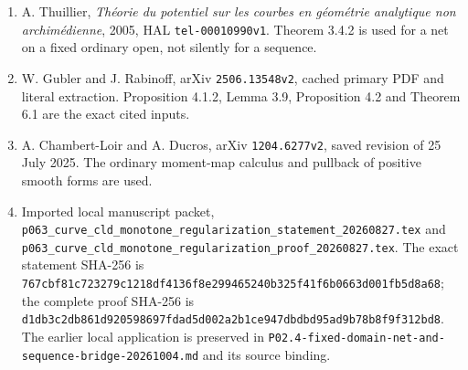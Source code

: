 \documentclass[
  11pt,
]{article}
\providecommand{\tightlist}{%
  \setlength{\itemsep}{0pt}\setlength{\parskip}{0pt}}
\begin{document}
\begin{enumerate}
\def\labelenumi{\arabic{enumi}.}
\tightlist
\item
  A. Thuillier, \emph{Théorie du potentiel sur les courbes en géométrie
  analytique non archimédienne}, 2005, HAL \texttt{tel-00010990v1}.
  Theorem 3.4.2 is used for a net on a fixed ordinary open, not silently
  for a sequence.
\item
  W. Gubler and J. Rabinoff, arXiv \texttt{2506.13548v2}, cached primary
  PDF and literal extraction. Proposition 4.1.2, Lemma 3.9, Proposition
  4.2 and Theorem 6.1 are the exact cited inputs.
\item
  A. Chambert-Loir and A. Ducros, arXiv \texttt{1204.6277v2}, saved
  revision of 25 July 2025. The ordinary moment-map calculus and
  pullback of positive smooth forms are used.
\item
  Imported local manuscript packet,
  \texttt{p063\_curve\_cld\_monotone\_regularization\_statement\_20260827.tex}
  and
  \texttt{p063\_curve\_cld\_monotone\_regularization\_proof\_20260827.tex}.
  The exact statement SHA-256 is
  \texttt{767cbf81c723279c1218df4136f8e299465240b325f41f6b0663d001fb5d8a68};
  the complete proof SHA-256 is
  \texttt{d1db3c2db861d920598697fdad5d002a2b1ce947dbdbd95ad9b78b8f9f312bd8}.
  The earlier local application is preserved in
  \texttt{P02.4-fixed-domain-net-and-sequence-bridge-20261004.md} and
  its source binding.
\end{enumerate}
\end{document}

